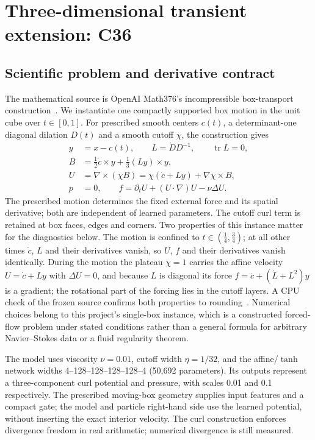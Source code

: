 \documentclass[11pt]{article}
\begin{document}
\section{Three-dimensional transient extension: C36}\label{sec:c36}
\subsection{Scientific problem and derivative contract}
The mathematical source is OpenAI Math376's incompressible box-transport
construction~\cite{math376}. We instantiate one compactly supported box
motion in the unit cube over $t\in[0,1]$. For prescribed smooth centers
$c(t)$, a determinant-one diagonal dilation $D(t)$ and a smooth cutoff
$\chi$, the construction gives
\begin{align}
y&=x-c(t),\qquad L=\dot D D^{-1},\qquad \operatorname{tr}L=0,\\
B&=\tfrac12\dot c\times y+\tfrac13(Ly)\times y,\\
U&=\nabla\times(\chi B)=\chi(\dot c+Ly)+\nabla\chi\times B,\\
p&=0,\qquad f=\partial_t U+(U\cdot\nabla)U-\nu\Delta U.
\label{eq:math376source}
\end{align}
The prescribed motion determines the fixed external force and its spatial
derivative; both are independent of learned parameters. The cutoff curl
term is retained at box faces, edges and corners. Two properties of this
instance matter for the diagnostics below. The motion is confined to
$t\in(\tfrac14,\tfrac34)$; at all other times $\dot c$, $L$ and their
derivatives vanish, so $U$, $f$ and their derivatives vanish identically.
During the motion the plateau $\chi=1$ carries the affine velocity
$U=\dot c+Ly$ with $\Delta U=0$, and because $L$ is diagonal its force
$f=\ddot c+(\dot L+L^2)y$ is a gradient; the rotational part of the forcing
lies in the cutoff layers. A CPU check of the frozen source confirms both
properties to rounding~\cite{flashns3dartifact}. Numerical choices belong
to this project's single-box instance, which is a constructed forced-flow
problem under stated conditions rather than a general formula for arbitrary
Navier--Stokes data or a fluid regularity theorem.

The model uses viscosity $\nu=0.01$, cutoff width $\eta=1/32$, and the
affine/$\tanh$ network widths 4--128--128--128--128--4 (50,692 parameters).
Its outputs represent a three-component curl potential and pressure, with
scales 0.01 and 0.1 respectively. The prescribed moving-box geometry
supplies input features and a compact gate; the model and particle
right-hand side use the learned potential, without inserting the exact
interior velocity. The curl construction enforces divergence freedom in
real arithmetic; numerical divergence is still measured.
\end{document}
